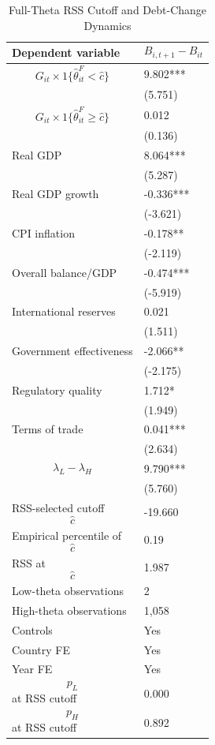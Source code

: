 \begin{table}[H]\centering
\begin{threeparttable}
\caption{Full-Theta RSS Cutoff and Debt-Change Dynamics}
\label{tab:deltaB_rss_cutoff_fulltheta}
\scriptsize
\begin{tabularx}{\textwidth}{lY}
\toprule
Dependent variable & $$B_{i,t+1}-B_{it}$$ \\
\midrule
$$G_{it}\times 1\{\widehat{\theta}^{F}_{it}<\widehat{c}\}$$ & 9.802*** \\
 & (5.751) \\
$$G_{it}\times 1\{\widehat{\theta}^{F}_{it}\geq\widehat{c}\}$$ & 0.012 \\
 & (0.136) \\
Real GDP & 8.064*** \\
 & (5.287) \\
Real GDP growth & -0.336*** \\
 & (-3.621) \\
CPI inflation & -0.178** \\
 & (-2.119) \\
Overall balance/GDP & -0.474*** \\
 & (-5.919) \\
International reserves & 0.021 \\
 & (1.511) \\
Government effectiveness & -2.066** \\
 & (-2.175) \\
Regulatory quality & 1.712* \\
 & (1.949) \\
Terms of trade & 0.041*** \\
 & (2.634) \\
$$\lambda_L-\lambda_H$$ & 9.790*** \\
 & (5.760) \\
\midrule
RSS-selected cutoff $$\widehat{c}$$ & -19.660 \\
Empirical percentile of $$\widehat{c}$$ & 0.19 \\
RSS at $$\widehat{c}$$ & 1.987 \\
Low-theta observations & 2 \\
High-theta observations & 1,058 \\
Controls & Yes \\
Country FE & Yes \\
Year FE & Yes \\
$$p_L$$ at RSS cutoff & 0.000 \\
$$p_H$$ at RSS cutoff & 0.892 \\

\end{tabularx}
\end{threeparttable}
\end{table}
